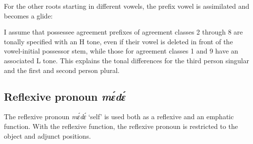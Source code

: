 \noindent For the other roots starting in different vowels, the prefix vowel is assimilated and becomes a glide:



\noindent I assume that possessee agreement prefixes of agreement classes 2 through 8 are tonally specified with an H tone, even if their vowel is deleted in front of the vowel-initial possessor stem, while those for agreement classes 1 and 9 have an associated L tone. This explains the tonal differences for the third person singular and the first and second person plural. 


\subsection{Reflexive pronoun {\itshape mɛ́dɛ́}}
\label{sec:REFL}

The reflexive pronoun {\itshape mɛ́dɛ́} `self' is used both as a reflexive and an emphatic function. With the reflexive function, the reflexive pronoun is restricted to the object and adjunct positions. 

